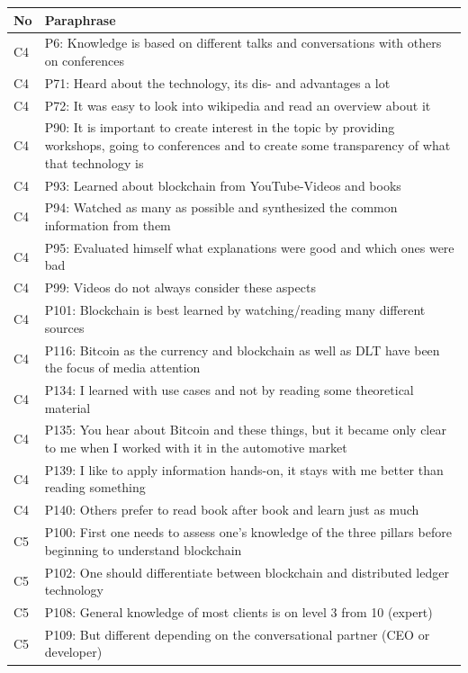 \begin{table}[H]
    \centering
    \begin{tabularx}{\textwidth}{l|X}
    No & Paraphrase \\\hline
    C4 & P6: Knowledge is based on different talks and conversations with others on conferences \\  
	C4 & P71: Heard about the technology, its dis- and advantages a lot  \\  
	C4 & P72: It was easy to look into wikipedia and read an overview about it \\  
	C4 & P90: It is important to create interest in the topic by providing workshops, going to conferences and to create some transparency of what that technology is \\  
	C4 & P93: Learned about blockchain from YouTube-Videos and books \\  
	C4 & P94: Watched as many as possible and synthesized the common information from them \\  
	C4 & P95: Evaluated himself what explanations were good and which ones were bad \\  
	C4 & P99: Videos do not always consider these aspects \\  
	C4 & P101: Blockchain is best learned by watching/reading many different sources \\  
	C4 & P116: Bitcoin as the currency and blockchain as well as DLT have been the focus of media attention \\  
	C4 & P134: I learned with use cases and not by reading some theoretical material \\  
	C4 & P135: You hear about Bitcoin and these things, but it became only clear to me when I worked with it in the automotive market \\  
	C4 & P139: I like to apply information hands-on, it stays with me better than reading something \\  
	C4 & P140: Others prefer to read book after book and learn just as much \\  
	C5 & P100: First one needs to assess one's knowledge of the three pillars before beginning to understand blockchain \\  
	C5 & P102: One should differentiate between blockchain and distributed ledger technology \\  
	C5 & P108: General knowledge of most clients is on level 3 from 10 (expert) \\  
	C5 & P109: But different depending on the conversational partner (CEO or developer) \\  

\end{tabularx}
\end{table}
